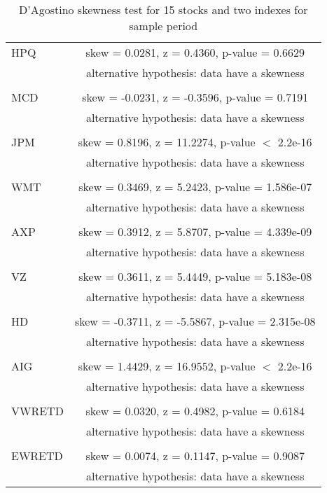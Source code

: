 \documentclass[11pt]{article}
\begin{document}
\begin{table}
\begin{tabular}{lc}
HPQ

&skew = 0.0281, z = 0.4360, p-value = 0.6629\\
&alternative hypothesis: data have a skewness\\
\\

MCD


&skew = -0.0231, z = -0.3596, p-value = 0.7191\\
&alternative hypothesis: data have a skewness\\
\\

JPM

	
&skew = 0.8196, z = 11.2274, p-value $<$ 2.2e-16\\
&alternative hypothesis: data have a skewness\\
\\

WMT

	
&skew = 0.3469, z = 5.2423, p-value = 1.586e-07\\
&alternative hypothesis: data have a skewness\\
\\

AXP


&skew = 0.3912, z = 5.8707, p-value = 4.339e-09\\
&alternative hypothesis: data have a skewness\\
\\

VZ


&skew = 0.3611, z = 5.4449, p-value = 5.183e-08\\
&alternative hypothesis: data have a skewness\\
\\

HD

	
&skew = -0.3711, z = -5.5867, p-value = 2.315e-08\\
&alternative hypothesis: data have a skewness\\
\\

AIG

	
&skew = 1.4429, z = 16.9552, p-value $<$ 2.2e-16\\
&alternative hypothesis: data have a skewness\\
\\
VWRETD


&skew = 0.0320, z = 0.4982, p-value = 0.6184\\
&alternative hypothesis: data have a skewness\\

\\
EWRETD


&skew = 0.0074, z = 0.1147, p-value = 0.9087\\
&alternative hypothesis: data have a skewness\\



\end{tabular}
\caption{D'Agostino skewness test for 15 stocks and two indexes for sample period}\label{tab4}
\end{table}
\end{document}
